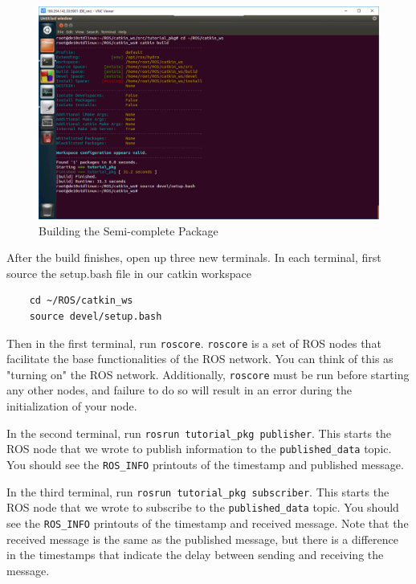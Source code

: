 \documentclass[11pt, twoside, pdftex]{article}
\begin{document}
\begin{figure}[H]
	\begin{center}
		\includegraphics[scale=0.55]{figures/catkin_build_tutorial_pkg_2.png}
		\caption{Building the Semi-complete Package}
		\label{fig:catkinbuildtutorialpkg2}
	\end{center}
\end{figure}

After the build finishes, open up three new terminals. In each terminal, first source the setup.bash file in our catkin workspace 
\begin{lstlisting}
	cd ~/ROS/catkin_ws
	source devel/setup.bash
\end{lstlisting}
Then in the first terminal, run \lstinline|roscore|. \lstinline|roscore| is a set of ROS nodes that facilitate the base functionalities of the ROS network. You can think of this as "turning on" the ROS network. Additionally, \lstinline|roscore| must be run before starting any other nodes, and failure to do so will result in an error during the initialization of your node.

In the second terminal, run \lstinline|rosrun tutorial_pkg publisher|. This starts the ROS node that we wrote to publish information to the \lstinline|published_data| topic. You should see the \lstinline|ROS_INFO| printouts of the timestamp and published message.

In the third terminal, run \lstinline|rosrun tutorial_pkg subscriber|. This starts the ROS node that we wrote to subscribe to the \lstinline|published_data| topic. You should see the \lstinline|ROS_INFO| printouts of the timestamp and received message. Note that the received message is the same as the published message, but there is a difference in the timestamps that indicate the delay between sending and receiving the message.
\end{document}

